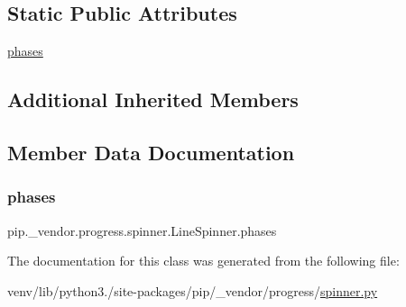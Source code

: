 \subsection*{Static Public Attributes}
\begin{DoxyCompactItemize}
\item 
\hyperlink{classpip_1_1__vendor_1_1progress_1_1spinner_1_1LineSpinner_a205449f3a4ec3398bc8621d7e9454af4}{phases}
\end{DoxyCompactItemize}
\subsection*{Additional Inherited Members}


\subsection{Member Data Documentation}
\mbox{\label{classpip_1_1__vendor_1_1progress_1_1spinner_1_1LineSpinner_a205449f3a4ec3398bc8621d7e9454af4}} 
\subsubsection{\texorpdfstring{phases}{phases}}
{\footnotesize\ttfamily pip.\+\_\+vendor.\+progress.\+spinner.\+Line\+Spinner.\+phases\hspace{0.3cm}{\ttfamily [static]}}



The documentation for this class was generated from the following file\+:\begin{DoxyCompactItemize}
\item 
venv/lib/python3./site-\/packages/pip/\+\_\+vendor/progress/\hyperlink{spinner_8py}{spinner.\+py}\end{DoxyCompactItemize}
